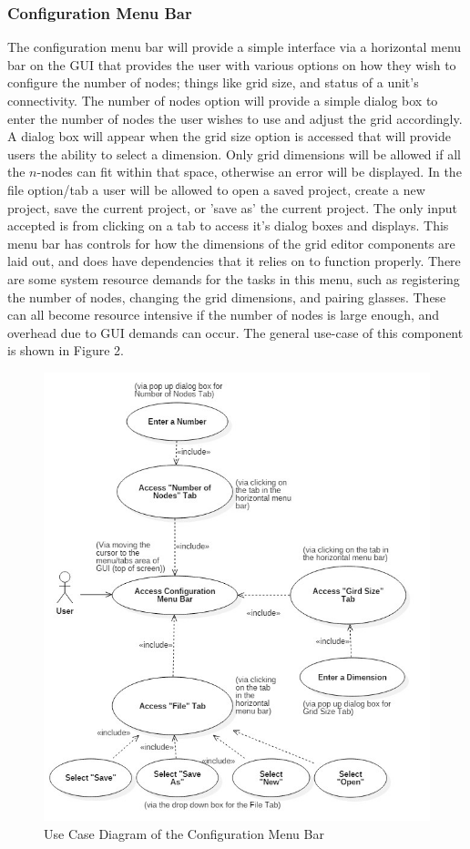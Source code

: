 \documentclass[12pt]{article}
\begin{document}
	\subsubsection {Configuration Menu Bar}
  	The configuration menu bar will provide a simple interface via a horizontal menu bar on the GUI that provides the user with various options on how they wish to configure the number of nodes; things like grid size, and status of a unit's connectivity. The number of nodes option will provide a simple dialog box to enter the number of nodes the user wishes to use and adjust the grid accordingly.  A dialog box will appear when the grid size option is accessed that will provide users the ability to select a dimension. Only grid dimensions will be allowed if all the $n$-nodes can fit within that space, otherwise an error will be displayed. In the file option/tab a user will be allowed to open a saved project, create a new project, save the current project, or 'save as' the current project. 
    The only input accepted is from clicking on a tab to access it's dialog boxes and displays. This menu bar has controls for how the dimensions of the grid editor components are laid out, and does have dependencies that it relies on to function properly. There are some system resource demands for the tasks in this menu, such as registering the number of nodes, changing the grid dimensions, and pairing glasses. These can all become resource intensive if the number of nodes is large enough, and overhead due to GUI demands can occur. The general use-case of this component is shown in Figure 2.	
  	\begin{figure}[ht!]
  		\centering
  		\includegraphics[width=\linewidth]{Configuration_Editor.JPG}
  		\caption{Use Case Diagram of the Configuration Menu Bar \label{overflow}}
  	\end{figure}
	
\end{document}
